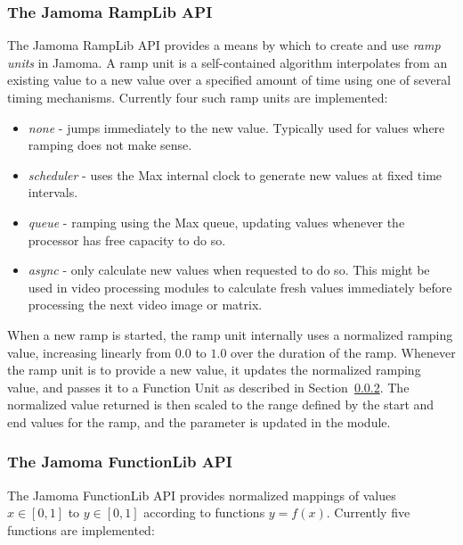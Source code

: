 \documentclass{NIME-alternate}
\begin{document}
\subsubsection{The Jamoma RampLib API} %
\label{ssub:the_ramp_lib}

The Jamoma RampLib API provides a means by which to create and use \emph{ramp units} in Jamoma.  A ramp unit is a self-contained algorithm interpolates from an existing value to a new value over a specified amount of time using one of several timing mechanisms. Currently four such ramp units are implemented:

\begin{itemize}

	\item \emph{none} - jumps immediately to the new value. Typically used for values where ramping does not make sense.

	\item \emph{scheduler} - uses the Max internal clock to generate new values at fixed time intervals.

	\item \emph{queue} - ramping using the Max queue, updating values whenever the processor has free capacity to do so.

	\item \emph{async} - only calculate new values when requested to do so. This might be used in video processing modules to calculate fresh values immediately before processing the next video image or matrix.
	
\end{itemize}

When a new ramp is started, the ramp unit internally uses a normalized ramping value, increasing linearly from $0.0$ to $1.0$ over the duration of the ramp. Whenever the ramp unit is to provide a new value, it updates the normalized ramping value, and passes it to a Function Unit as described in Section~\ref{ssub:the_function_lib}. The normalized value returned is then scaled to the range defined by the start and end values for the ramp, and the parameter is updated in the module.



\subsubsection{The Jamoma FunctionLib API} %
\label{ssub:the_function_lib}

The Jamoma FunctionLib API provides normalized mappings of values $x \in [0,1]$ to $y \in [0,1]$ according to functions $y = f(x)$. Currently five functions are implemented: 
\end{document}
